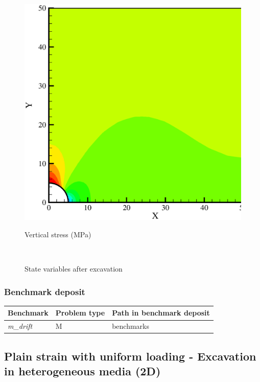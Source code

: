 \begin{figure}[!htb]
\begin{center}
\begin{minipage}[t]{0.45\textwidth}
\begin{center}
    \includegraphics[scale=0.3]{M/ee_syy.eps}\\
    \centerline{Vertical stress (MPa)}
    \end{center}
   \end{minipage}\\
  \end{center}
  \caption{State variables after excavation}
  \label{fig:e2cont}
\end{figure}
\subsubsection*{Benchmark deposit}
\begin{tabular}{|l|l|l|}
  \hline
  Benchmark & Problem type & Path in benchmark deposit \\
  \hline
 \emph{m\_drift} & M & benchmarks\verb \M\ \\
  \hline
\end{tabular}

\clearpage

\subsection[Excavation in heterogeneous media (2D)]{Plain strain with uniform loading - Excavation in heterogeneous media (2D)}
\label{sec:e3}
